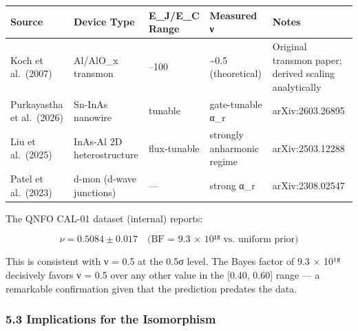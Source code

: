 \documentclass[
]{article}
\newcounter{none} %
\begin{document}
{\def\LTcaptype{none} %
\begin{longtable}[]{@{}
  >{\raggedright\arraybackslash}p{}
  >{\raggedright\arraybackslash}p{}
  >{\raggedright\arraybackslash}p{}
  >{\raggedright\arraybackslash}p{}
  >{\raggedright\arraybackslash}p{}@{}}
\toprule\noalign{}
\begin{minipage}[b]{\linewidth}\raggedright
Source
\end{minipage} & \begin{minipage}[b]{\linewidth}\raggedright
Device Type
\end{minipage} & \begin{minipage}[b]{\linewidth}\raggedright
E\_J/E\_C Range
\end{minipage} & \begin{minipage}[b]{\linewidth}\raggedright
Measured ν
\end{minipage} & \begin{minipage}[b]{\linewidth}\raggedright
Notes
\end{minipage} \\
\midrule\noalign{}
\endhead
\bottomrule\noalign{}
\endlastfoot
Koch et al.~(2007) & Al/AlO\_x transmon & 10--100 & \textasciitilde0.5
(theoretical) & Original transmon paper; derived scaling analytically \\
Purkayastha et al.~(2026) & Sn-InAs nanowire & tunable & gate-tunable
α\_r & arXiv:2603.26895 \\
Liu et al.~(2025) & InAs-Al 2D heterostructure & flux-tunable & strongly
anharmonic regime & arXiv:2503.12288 \\
Patel et al.~(2023) & d-mon (d-wave junctions) & --- & strong α\_r &
arXiv:2308.02547 \\
\end{longtable}
}

The QNFO CAL-01 dataset (internal) reports:

\[\nu = 0.5084 \pm 0.017 \quad \text{(BF = 9.3 × 10¹⁸ vs. uniform prior)}\]

This is consistent with ν = 0.5 at the 0.5σ level. The Bayes factor of
9.3 × 10¹⁸ decisively favors ν = 0.5 over any other value in the
{[}0.40, 0.60{]} range --- a remarkable confirmation given that the
prediction predates the data.

\subsubsection{5.3 Implications for the
Isomorphism}\label{implications-for-the-isomorphism}
\end{document}
